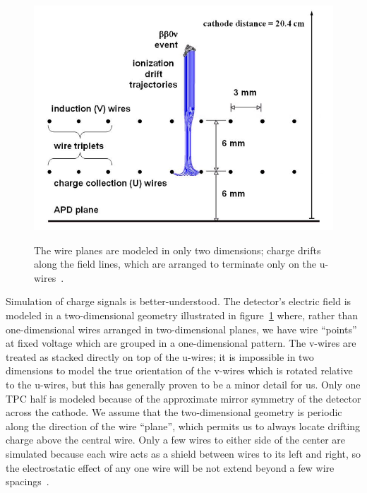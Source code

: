 \begin{figure}
\begin{center}
\includegraphics[keepaspectratio=true,width=\textwidth]{ChargeDrift2DModel.png}
\end{center}
\renewcommand{\baselinestretch}{1}
\small\normalsize
\begin{quote}
\caption{The wire planes are modeled in only two dimensions; charge drifts along the field lines, which are arranged to terminate only on the u-wires~\cite{MCDocumentRun2a}.}
\label{fig:TwoDimensionalWireModel}
\end{quote}
\end{figure}
\renewcommand{\baselinestretch}{2}
\small\normalsize

Simulation of charge signals is better-understood.  The detector's electric field is modeled in a two-dimensional geometry illustrated in figure~\ref{fig:TwoDimensionalWireModel} where, rather than one-dimensional wires arranged in two-dimensional planes, we have wire ``points'' at fixed voltage which are grouped in a one-dimensional pattern.  The v-wires are treated as stacked directly on top of the u-wires; it is impossible in two dimensions to model the true orientation of the v-wires which is rotated relative to the u-wires, but this has generally proven to be a minor detail for us.  Only one TPC half is modeled because of the approximate mirror symmetry of the detector across the cathode.  We assume that the two-dimensional geometry is periodic along the direction of the wire ``plane'', which permits us to always locate drifting charge above the central wire.  Only a few wires to either side of the center are simulated because each wire acts as a shield between wires to its left and right, so the electrostatic effect of any one wire will be not extend beyond a few wire spacings~\cite{MCDocumentRun2a}.

